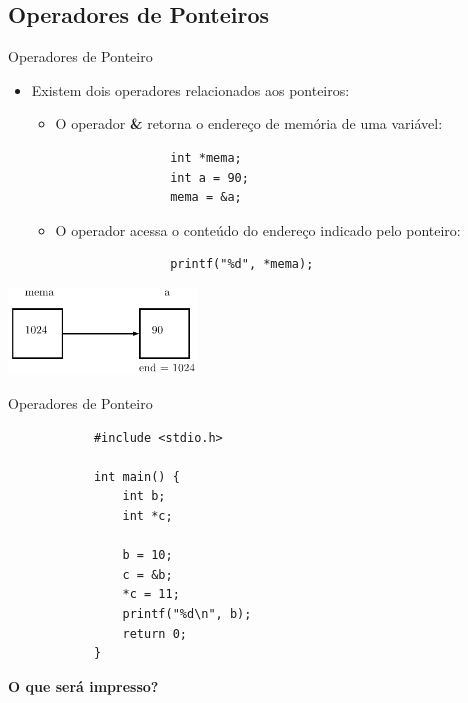 \documentclass[handout]{beamer}
\begin{document}
\subsection{Operadores de Ponteiros}

\begin{frame}[fragile]{Operadores de Ponteiro}
    \begin{itemize}[<+->]
        \item Existem dois operadores relacionados aos ponteiros:
        \begin{itemize}
            \item O operador {\bf \&} retorna o endereço de memória de uma variável:
            \begin{verbatim}
                int *mema;
                int a = 90;
                mema = &a;
            \end{verbatim}
            \item O operador {\bf *} acessa o conteúdo do endereço indicado pelo ponteiro:
            \begin{verbatim}
                printf("%d", *mema);
            \end{verbatim}
        \end{itemize}
    \end{itemize}
    \pause
    \begin{center}
        \includegraphics[width=5cm]{ponteiro.pdf}
    \end{center}
\end{frame}

\begin{frame}[fragile]{Operadores de Ponteiro}
    \begin{small}
        \begin{verbatim}
            #include <stdio.h>

            int main() {
                int b;
                int *c;

                b = 10;
                c = &b;
                *c = 11;
                printf("%d\n", b);
                return 0;
            }
        \end{verbatim}
    \end{small}
    \textbf{O que será impresso?}
\end{frame}
\end{document}
